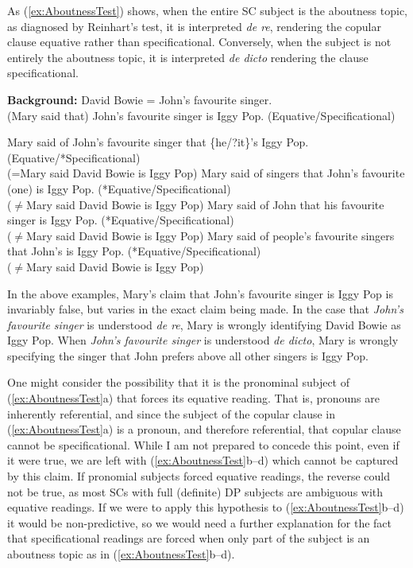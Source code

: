 \documentclass[
	letterpaper,
]{article}
\begin{document}
As (\ref{ex:AboutnessTest}) shows, when the entire SC subject is the aboutness topic, as diagnosed by Reinhart's test, it is interpreted \textit{de re}, rendering the copular clause equative rather than specificational.
Conversely, when the subject is not entirely the aboutness topic, it is interpreted \textit{de dicto} rendering the clause specificational.
\begin{exe}
	\ex\label{ex:AboutnessTest} \textbf{Background:} David Bowie = John's favourite singer.\\
	(Mary said that) John's favourite singer is Iggy Pop. (Equative/Specificational)
	\begin{xlist}
		\ex Mary said of John's favourite singer that \{he/?it\}'s Iggy Pop.(Equative/*Specificational)\\
		(=Mary said David Bowie is Iggy Pop)
		\ex Mary said of singers that John's favourite (one) is Iggy Pop. (*Equative/Specificational)\\
		($\neq$Mary said David Bowie is Iggy Pop)
		\ex Mary said of John that his favourite singer is Iggy Pop. (*Equative/Specificational)\\
		($\neq$Mary said David Bowie is Iggy Pop)
		\ex Mary said of people's favourite singers that John's is Iggy Pop. (*Equative/Specificational)\\
		($\neq$Mary said David Bowie is Iggy Pop)
	\end{xlist}
\end{exe}
In the above examples, Mary's claim that John's favourite singer is Iggy Pop is invariably false, but varies in the exact claim being made.
In the case that \textit{John's favourite singer} is understood \textit{de re}, Mary is wrongly identifying David Bowie as Iggy Pop.
When \textit{John's favourite singer} is understood \textit{de dicto}, Mary is wrongly specifying the singer that John prefers above all other singers is Iggy Pop.

One might consider the possibility that it is the pronominal subject of (\ref{ex:AboutnessTest}a) that forces its equative reading.
That is, pronouns are inherently referential, and since the subject of the copular clause in (\ref{ex:AboutnessTest}a) is a pronoun, and therefore referential, that copular clause cannot be specificational. 
While I am not prepared to concede this point, even if it were true, we are left with (\ref{ex:AboutnessTest}b--d) which cannot be captured by this claim.
If pronomial subjects forced equative readings, the reverse could not be true, as most SCs with full (definite) DP subjects are ambiguous with equative readings.
If we were to apply this hypothesis to (\ref{ex:AboutnessTest}b--d) it would be non-predictive, so we would need a further explanation for the fact that specificational readings are forced when only part of the subject is an aboutness topic as in (\ref{ex:AboutnessTest}b--d).
\end{document}

